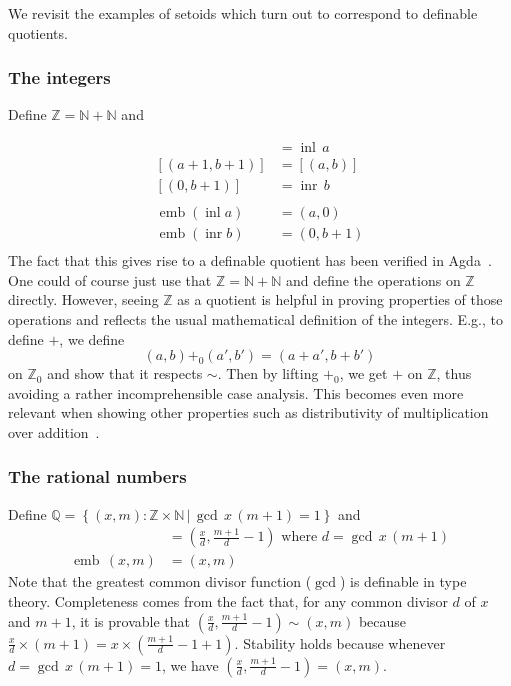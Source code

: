 \documentclass[envcountsame]{llncs}
\newcommand{\N}{\mathbb{N}}
\newcommand{\Q}{\mathbb{Q}}
\newcommand{\Z}{\mathbb{Z}}
\providecommand{\class}[1]{[#1]}
\providecommand{\set}  [1]{\left\{#1\right\}}
\DeclareMathOperator{\emb}{emb}
\DeclareMathOperator{\inl}{inl}
\DeclareMathOperator{\inr}{inr}
\begin{document}
We revisit the examples of setoids which turn out to correspond to
definable quotients.

\subsubsection*{The integers}
Define $\Z =\N + \N $ and

\begin{align*}
\class{(a,0)} &= \inl\,a\\
\class{(a+1,b+1)} &= \class{(a,b)}\\
\class{(0,b+1)} &= \inr\,b\\\\
\emb (\inl a) &= (a,0)\\
\emb (\inr b) &= (0,b+1)\\
\end{align*}
The fact that this gives rise to a definable quotient has been verified in Agda~\cite{nuo2010report}.
 One could of course just use that $\Z=\N + \N$ and define the operations on $\Z$ directly. However, seeing  $\Z$ as a quotient is helpful in proving properties of those operations and reflects the usual mathematical definition of the integers. E.g., to define $+$, we define
\[(a,b){+_0}(a', b')= (a+a',b+b')\]
on $\Z_0$ and show that it respects $\sim$. Then by lifting $+_0$, we get $+$ on $\Z$, thus avoiding a rather incomprehensible case analysis. This becomes even more relevant when showing other properties such as distributivity of multiplication over addition~\cite{nuo2010report}.

\subsubsection*{The rational numbers}

Define $\Q = \set{(x,m):\Z\times\N \,|\, \gcd\, x\,  (m+1) = 1}$ and
\begin{align*}
\class{(x,m)}&=\left(\frac{x}{d},\frac{m+1}{d}-1\right) \text{ where } d = \gcd\,x \,(m+1)\\
\emb \,(x,m) &= (x,m)
\end{align*}
Note that the greatest common divisor function ($\gcd$) is definable in type theory. Completeness comes from the fact that, for any common divisor $d$ of $x$ and $m+1$, it is provable that $\left(\frac x d,\frac {m+1} d-1\right)\sim\left(x,m\right)$ because $\frac x d \times (m+1) = x\times(\frac {m+1} d - 1+1)$.  Stability holds because whenever $d=\gcd\, x\, (m+1) = 1$, we have $\left(\frac{x}{d},\frac{m+1}{d}-1\right)=(x,m)$.
\end{document}
